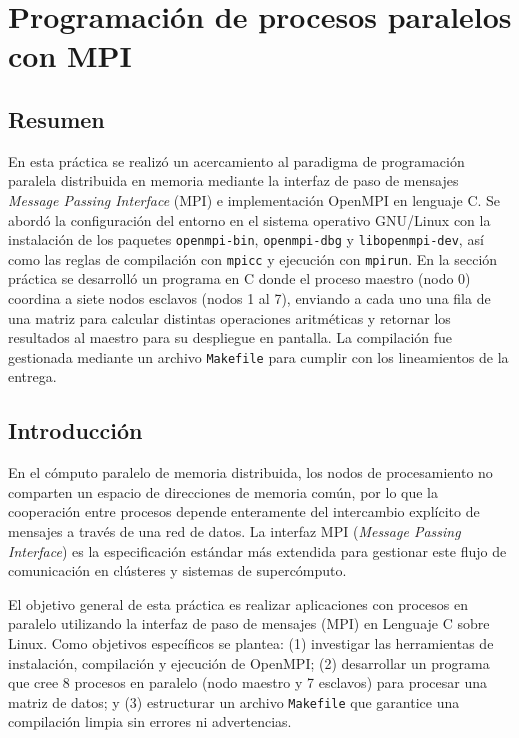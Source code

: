 \setcounter{chapter}{4}
\chapter{Programación de procesos paralelos con MPI}

\section{Resumen}
En esta práctica se realizó un acercamiento al paradigma de programación paralela distribuida en memoria mediante la interfaz de paso de mensajes \textit{Message Passing Interface} (MPI) e implementación OpenMPI en lenguaje C. Se abordó la configuración del entorno en el sistema operativo GNU/Linux con la instalación de los paquetes \texttt{openmpi-bin}, \texttt{openmpi-dbg} y \texttt{libopenmpi-dev}, así como las reglas de compilación con \texttt{mpicc} y ejecución con \texttt{mpirun}. En la sección práctica se desarrolló un programa en C donde el proceso maestro (nodo 0) coordina a siete nodos esclavos (nodos 1 al 7), enviando a cada uno una fila de una matriz para calcular distintas operaciones aritméticas y retornar los resultados al maestro para su despliegue en pantalla. La compilación fue gestionada mediante un archivo \texttt{Makefile} para cumplir con los lineamientos de la entrega.

\section{Introducción}
En el cómputo paralelo de memoria distribuida, los nodos de procesamiento no comparten un espacio de direcciones de memoria común, por lo que la cooperación entre procesos depende enteramente del intercambio explícito de mensajes a través de una red de datos. La interfaz MPI (\textit{Message Passing Interface}) es la especificación estándar más extendida para gestionar este flujo de comunicación en clústeres y sistemas de supercómputo.

El objetivo general de esta práctica es realizar aplicaciones con procesos en paralelo utilizando la interfaz de paso de mensajes (MPI) en Lenguaje C sobre Linux. Como objetivos específicos se plantea: (1) investigar las herramientas de instalación, compilación y ejecución de OpenMPI; (2) desarrollar un programa que cree 8 procesos en paralelo (nodo maestro y 7 esclavos) para procesar una matriz de datos; y (3) estructurar un archivo \texttt{Makefile} que garantice una compilación limpia sin errores ni advertencias.

